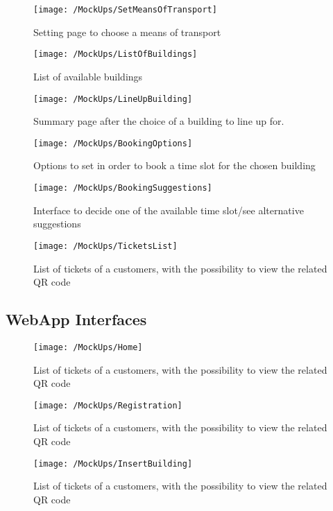 \begin{figure}[H]
	\centering
	\texttt{[image: /MockUps/SetMeansOfTransport]}
	\caption{Setting page to choose a means of transport}
\end{figure}

\begin{figure}[H]
	\centering
	\texttt{[image: /MockUps/ListOfBuildings]}
	\caption{List of available buildings}
\end{figure}

\newpage

\begin{figure}[H]
	\centering
	\texttt{[image: /MockUps/LineUpBuilding]}
	\caption{Summary page after the choice of a building to line up for.}
\end{figure}

\begin{figure}[H]
	\centering
	\texttt{[image: /MockUps/BookingOptions]}
	\caption{Options to set in order to book a time slot for the chosen building}
\end{figure}

\newpage

\begin{figure}[H]
	\centering
	\texttt{[image: /MockUps/BookingSuggestions]}
	\caption{Interface to decide one of the available time slot/see alternative suggestions}
\end{figure}

\begin{figure}[H]
	\centering
	\texttt{[image: /MockUps/TicketsList]}
	\caption{List of tickets of a customers, with the possibility to view the related QR code}
\end{figure}
\newpage

\subsection {WebApp Interfaces}
\begin{figure}[H]
	\centering
	\texttt{[image: /MockUps/Home]}
	\caption{List of tickets of a customers, with the possibility to view the related QR code}
\end{figure}

\begin{figure}[H]
	\centering
	\texttt{[image: /MockUps/Registration]}
	\caption{List of tickets of a customers, with the possibility to view the related QR code}
\end{figure}

\begin{figure}[H]
	\centering
	\texttt{[image: /MockUps/InsertBuilding]}
	\caption{List of tickets of a customers, with the possibility to view the related QR code}
\end{figure}
\newpage
